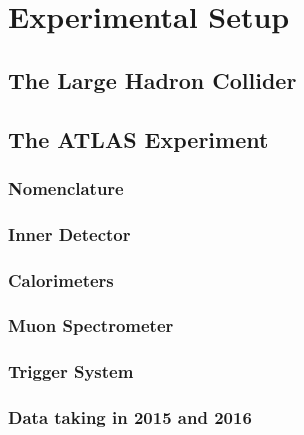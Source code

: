 \chapter{Experimental Setup}\label{cha:experimental_setup}

\section{The Large Hadron Collider}\label{sec:the_large_hadron_collider}

\section{The ATLAS Experiment}\label{sec:the_atlas_experiment}

\subsection{Nomenclature}\label{sub:setup:nomenclature}

\subsection{Inner Detector}\label{sub:setup:id}

\subsection{Calorimeters}\label{sub:setup:calorimeters}

\subsection{Muon Spectrometer}\label{sub:setup:muons}

\subsection{Trigger System}\label{sub:setup:trigger}

\subsection{Data taking in 2015 and 2016}\label{sub:setup:data}
